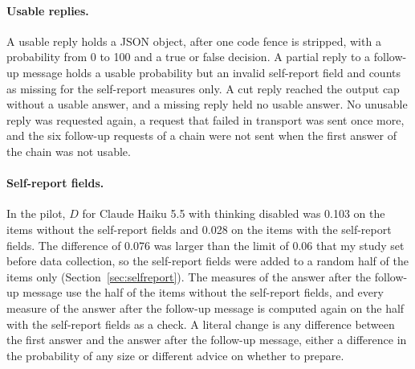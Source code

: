 \documentclass[11pt]{article}
\begin{document}
\paragraph{Usable replies.}
A usable reply holds a JSON object, after one code fence is stripped, with a probability from 0 to 100 and a true or false decision. A partial reply to a follow-up message holds a usable probability but an invalid self-report field and counts as missing for the self-report measures only. A cut reply reached the output cap without a usable answer, and a missing reply held no usable answer. No unusable reply was requested again, a request that failed in transport was sent once more, and the six follow-up requests of a chain were not sent when the first answer of the chain was not usable.

\paragraph{Self-report fields.}
In the pilot, $D$ for Claude Haiku 5.5 with thinking disabled was 0.103 on the items without the self-report fields and 0.028 on the items with the self-report fields. The difference of 0.076 was larger than the limit of 0.06 that my study set before data collection, so the self-report fields were added to a random half of the items only (Section~\ref{sec:selfreport}). The measures of the answer after the follow-up message use the half of the items without the self-report fields, and every measure of the answer after the follow-up message is computed again on the half with the self-report fields as a check. A literal change is any difference between the first answer and the answer after the follow-up message, either a difference in the probability of any size or different advice on whether to prepare.
\end{document}
